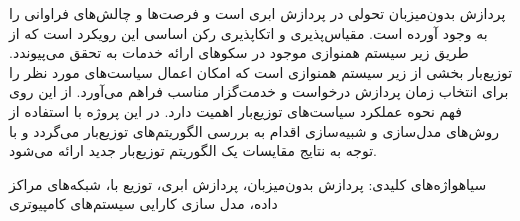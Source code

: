 
پردازش بدون‌میزبان تحولی در پردازش ابری است و فرصت‌ها و چالش‌های فراوانی
را به وجود آورده است. مقیاس‌پذیری و اتکاپذیری رکن اساسی این رویکرد است که
از طریق زیر سیستم همنوازی موجود در سکو‌های ارائه خدمات به تحقق می‌پیوندد.
توزیع‌بار بخشی از زیر سیستم همنوازی است که امکان اعمال سیاست‌های مورد نظر را
برای انتخاب زمان پردازش درخواست و خدمت‌گزار مناسب فراهم می‌آورد.
از این روی فهم نحوه عملکرد سیاست‌های توزیع‌بار اهمیت دارد. در این پروژه با استفاده
از روش‌های مدل‌سازی و شبیه‌سازی اقدام به بررسی الگوریتم‌های توزیع‌بار می‌گردد
و با توجه به نتایج مقایسات یک الگوریتم توزیع‌بار جدید ارائه می‌شود.

‌سیاه{واژه‌های کلیدی:}
‫پردازش بدون‌میزبان، پردازش ابری، توزیع با، شبکه‌های مراکز داده، مدل سازی کارایی سیستم‌های کامپیوتری
